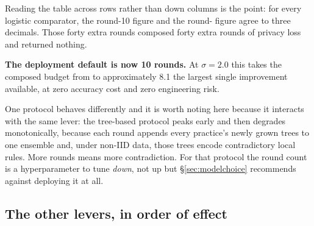 Reading the table across rows rather than down columns is the point: for every logistic comparator,
the round-10 figure and the round-\MaxRounds{} figure agree to three decimals. Those forty extra rounds
composed forty extra rounds of privacy loss and returned nothing.

\textbf{The deployment default is now 10 rounds.} At $\sigma = 2.0$ this takes the composed budget
from \EpsAtSigmaTwo{} to approximately 8.1 the largest single improvement available, at zero
accuracy cost and zero engineering risk.

One protocol behaves differently and it is worth noting here because it interacts with the same
lever: the tree-based protocol peaks early and then degrades monotonically, because each round
appends every practice's newly grown trees to one ensemble and, under non-IID data, those trees
encode contradictory local rules. More rounds means more contradiction. For that protocol the round
count is a hyperparameter to tune \emph{down}, not up but \S\ref{sec:modelchoice} recommends
against deploying it at all.

\subsection{The other levers, in order of effect}

